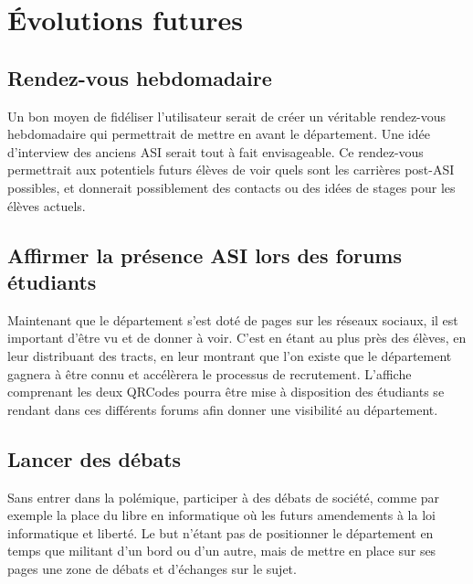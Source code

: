 \section{Évolutions futures}
\subsection{Rendez-vous hebdomadaire}
	Un bon moyen de fidéliser l'utilisateur serait de créer un véritable rendez-vous hebdomadaire qui permettrait de mettre en avant le département. 
	Une idée d'interview des anciens ASI serait tout à fait envisageable. Ce rendez-vous permettrait aux potentiels futurs élèves de voir quels sont les carrières post-ASI possibles, 
	et donnerait possiblement des contacts ou des idées de stages pour les élèves actuels.
	
\subsection{Affirmer la présence ASI lors des forums étudiants}
	Maintenant que le département s'est doté de pages sur les réseaux sociaux, il est important d'être vu et de donner à voir. C'est en étant au plus près des élèves, en leur distribuant 
	des tracts, en leur montrant que l'on existe que le département gagnera à être connu et accélèrera le processus de recrutement. L'affiche comprenant les deux QRCodes pourra être mise 
	à disposition des étudiants se rendant dans ces différents forums afin donner une visibilité au département.
	
\subsection{Lancer des débats}
	Sans entrer dans la polémique, participer à des débats de société, comme par exemple la place du libre en informatique où les futurs amendements à la loi informatique et liberté. Le 
	but n'étant pas de positionner le département en temps que militant d'un bord ou d'un autre, mais de mettre en place sur ses pages une zone de débats et d'échanges sur le sujet.
